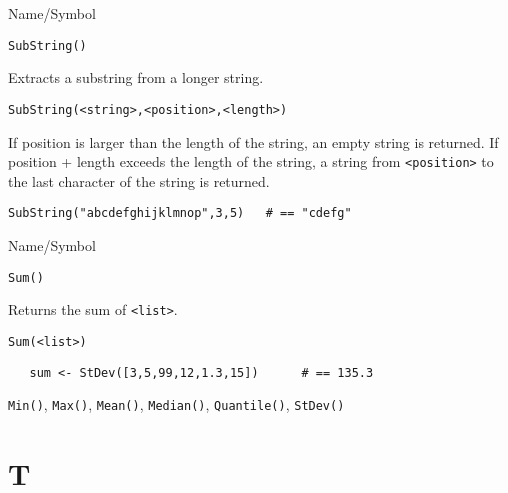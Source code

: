 \begin{desc}{Name/Symbol}
\item[Name/Symbol]  	\verb+SubString()+

\item[Description]  	Extracts a substring from a longer string.

\item[Usage]
\begin{verbatim}
SubString(<string>,<position>,<length>)
\end{verbatim}
  If position is larger than the length of the string, an empty string
  is returned.  If position + length exceeds the length of the string,
  a string from \verb+<position>+ to the last character of the string
  is returned.

\item[Example]
\begin{verbatim}
SubString("abcdefghijklmnop",3,5)	# == "cdefg"
\end{verbatim}

\item[See Also]	
\end{desc}

\rl





\begin{desc}{Name/Symbol}
\item[Name/Symbol]  	\verb+Sum()+ 

\item[Description]  Returns the sum  of \verb+<list>+.

\item[Usage]       	
\begin{verbatim}
Sum(<list>)        
\end{verbatim}

\item[Example]	
\begin{verbatim}
   sum <- StDev([3,5,99,12,1.3,15])      # == 135.3
\end{verbatim}

\item[See Also]     	\verb+Min()+, \verb+Max()+, \verb+Mean()+, \verb+Median()+, \verb+Quantile()+, \verb+StDev()+
\end{desc}

\rl

\section{T}
\rl

